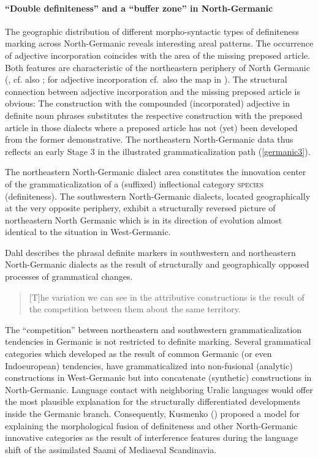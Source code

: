 {\paragraph{“Double definiteness” and a “buffer zone” in North-Germanic}\label{buffer}
The geographic distribution of different morpho-syntactic types of definiteness marking across North-Germanic reveals interesting areal patterns. The occurrence of adjective incorporation coincides with the area of the missing preposed article. Both features are characteristic of the northeastern periphery of North Germanic (\citealt{delsing1996b}, cf. also \citealt{riesler2001a,riesler2002a}; for adjective incorporation cf.~also the map in ). The structural connection between adjective incorporation and the missing preposed article is obvious: The construction with the compounded (incorporated) adjective in definite noun phrases substitutes the respective construction with the preposed article in those dialects where a preposed article has not (yet) been developed from the former demonstrative. The northeastern North-Germanic data thus reflects an early Stage 3 in the illustrated grammaticalization path (\ref{germanic3}).

The northeastern North-Germanic dialect area constitutes the innovation center of the grammaticalization of a (suffixed) inflectional category \textsc{species} (definiteness). The southwestern North-Germanic dialects, located geographically at the very opposite periphery, exhibit a structurally reversed picture of northeastern North Germanic which is in its direction of evolution almost identical to the situation in West-Germanic.

Dahl describes the phrasal definite markers in southwestern and northeastern North-Germanic dialects as the result of structurally and geographically opposed processes of grammatical changes.
\begin{quote}
[T]he variation we can see in the attributive constructions is the result of the competition between them about the same territory. \citep[147]{dahl2003}
\end{quote}
The “competition” between northeastern and southwestern grammaticalization tendencies in Germanic is not restricted to definite marking. Several grammatical categories which developed as the result of common Germanic (or even Indoeuropean) tendencies, have grammaticalized into non-fusional (analytic) constructions in West-Germanic but into concatenate (synthetic) constructions in North-Germanic. Language contact with neighboring Uralic languages would offer the most plausible explanation for the structurally differentiated developments inside the Germanic branch. Consequently, Kusmenko (\citeyear{kusmenko2008}) proposed a model for explaining the morphological fusion of definiteness and other North-Germanic innovative categories as the result of interference features during the language shift of the assimilated Saami of Mediaeval Scandinavia.

}

